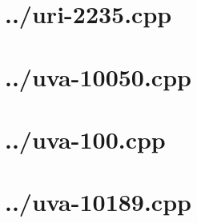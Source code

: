 \documentclass{article}
\begin{document}
\section*{../uri-2235.cpp}


\section*{../uva-10050.cpp}


\section*{../uva-100.cpp}


\section*{../uva-10189.cpp}

\end{document}

